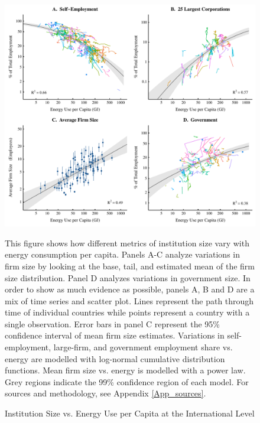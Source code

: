 \begin{figure}
	
	\centerline{\includegraphics[scale=1]{Fig1}}
	
	\caption{Institution Size vs. Energy Use per Capita at the International Level\label{Fig_Global_inst}}
	
	\small
	\smallskip
	
	
	This figure shows how different metrics of institution size vary with energy consumption per capita. Panels A-C analyze variations in firm size by looking at the base, tail, and estimated mean of the firm size distribution. Panel D analyzes variations in government size. In order to show as much evidence as possible, panels A, B and D are a mix of time series and scatter plot. Lines represent the path through time of individual countries while points represent a country with a single observation.  Error bars in panel C represent the 95\% confidence interval of mean firm size estimates.  Variations in self-employment, large-firm, and government employment share vs. energy are modelled with log-normal cumulative distribution functions. Mean firm size vs. energy is modelled with a power law. Grey regions indicate the 99\% confidence region of each model. For sources and methodology, see Appendix \ref{App_sources}.
	
\end{figure}

